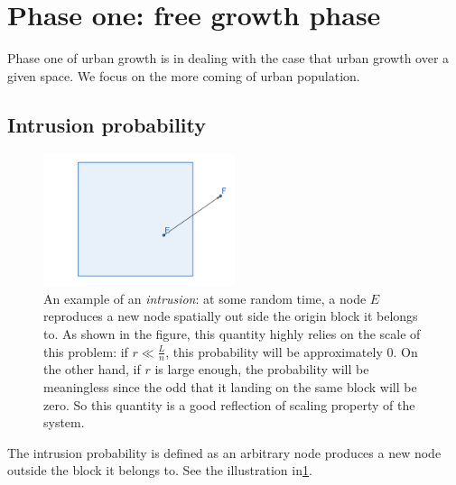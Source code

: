 \documentclass[aps,prl]{revtex4-2}
\begin{document}
\section{Phase one: free growth phase}

Phase one of urban growth is in dealing with the case that urban growth over a given space. We focus on the more coming of urban population.

\subsection{Intrusion probability}

\begin{figure}[b]
	\centering
	\includegraphics[width = 0.5\textwidth]{fig/intrusion_eg}
	\caption{An example of an \emph{intrusion}: at some random time, a node $E$ reproduces a new node spatially out side the origin block it belongs to. As shown in the figure, this quantity highly relies on the scale of this problem: if $r \ll \frac{L}{n}$, this probability will be approximately $0$. On the other hand, if $r$ is large enough, the probability will be meaningless since the odd that it landing on the same block will be zero. So this quantity is a good reflection of scaling property of the system. }\label{fig:intrusion_eg}
\end{figure}

The intrusion probability is defined as an arbitrary node produces a new node outside the block it belongs to. See the illustration in\@\ref{fig:intrusion_eg}.
\end{document}
